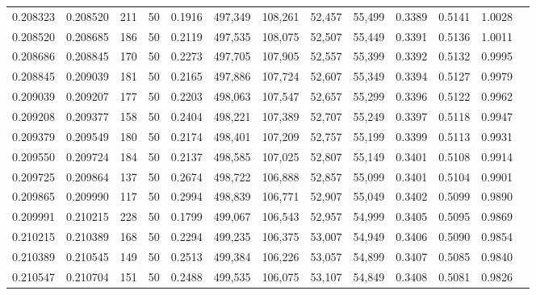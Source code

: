 \begin{tabular}{rrrrrrrrrrrrr}
0.208323 & 0.208520 &   211 &  50 &                                     0.1916 & 497,349 & 108,261 &  52,457 &  55,499 & 0.3389 & 0.5141 & 1.0028 \\
0.208520 & 0.208685 &   186 &  50 &                                     0.2119 & 497,535 & 108,075 &  52,507 &  55,449 & 0.3391 & 0.5136 & 1.0011 \\
0.208686 & 0.208845 &   170 &  50 &                                     0.2273 & 497,705 & 107,905 &  52,557 &  55,399 & 0.3392 & 0.5132 & 0.9995 \\
0.208845 & 0.209039 &   181 &  50 &                                     0.2165 & 497,886 & 107,724 &  52,607 &  55,349 & 0.3394 & 0.5127 & 0.9979 \\
0.209039 & 0.209207 &   177 &  50 &                                     0.2203 & 498,063 & 107,547 &  52,657 &  55,299 & 0.3396 & 0.5122 & 0.9962 \\
0.209208 & 0.209377 &   158 &  50 &                                     0.2404 & 498,221 & 107,389 &  52,707 &  55,249 & 0.3397 & 0.5118 & 0.9947 \\
0.209379 & 0.209549 &   180 &  50 &                                     0.2174 & 498,401 & 107,209 &  52,757 &  55,199 & 0.3399 & 0.5113 & 0.9931 \\
0.209550 & 0.209724 &   184 &  50 &                                     0.2137 & 498,585 & 107,025 &  52,807 &  55,149 & 0.3401 & 0.5108 & 0.9914 \\
0.209725 & 0.209864 &   137 &  50 &                                     0.2674 & 498,722 & 106,888 &  52,857 &  55,099 & 0.3401 & 0.5104 & 0.9901 \\
0.209865 & 0.209990 &   117 &  50 &                                     0.2994 & 498,839 & 106,771 &  52,907 &  55,049 & 0.3402 & 0.5099 & 0.9890 \\
0.209991 & 0.210215 &   228 &  50 &                                     0.1799 & 499,067 & 106,543 &  52,957 &  54,999 & 0.3405 & 0.5095 & 0.9869 \\
0.210215 & 0.210389 &   168 &  50 &                                     0.2294 & 499,235 & 106,375 &  53,007 &  54,949 & 0.3406 & 0.5090 & 0.9854 \\
0.210389 & 0.210545 &   149 &  50 &                                     0.2513 & 499,384 & 106,226 &  53,057 &  54,899 & 0.3407 & 0.5085 & 0.9840 \\
0.210547 & 0.210704 &   151 &  50 &                                     0.2488 & 499,535 & 106,075 &  53,107 &  54,849 & 0.3408 & 0.5081 & 0.9826 \\

\end{tabular}
